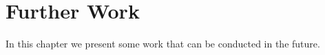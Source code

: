 
\chapter{Further Work}\label{Further Work}
In this chapter we present some work that can be conducted in the future.
